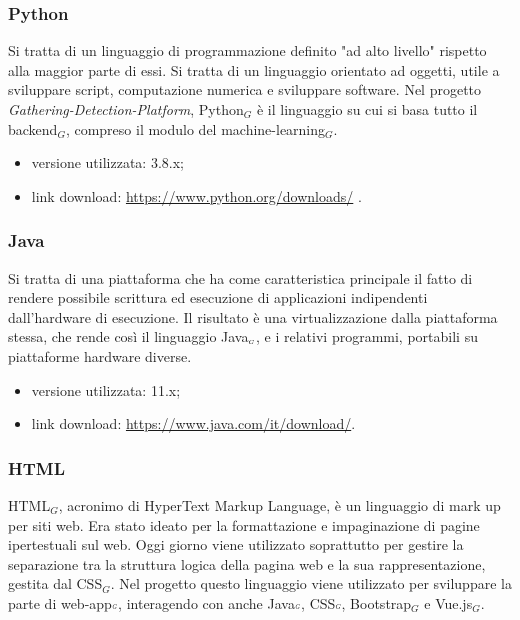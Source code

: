 \subsubsection{Python}\label{ProcessiPrimariCodificaPython}
Si tratta di un linguaggio di programmazione definito "ad alto livello" rispetto alla maggior parte di essi.
Si tratta di un linguaggio orientato ad oggetti, utile a sviluppare script, computazione numerica e sviluppare software.
Nel progetto \textit{Gathering-Detection-Platform}, Python$_G$ è il linguaggio su cui si basa tutto il backend$_G$, compreso il modulo del machine-learning$_G$.

\begin{itemize}
	\item versione utilizzata: 3.8.x;
	\item link download: \url{https://www.python.org/downloads/} .
\end{itemize}

\subsubsection{Java}\label{ProcessiPrimariCodificaJava}
Si tratta di una piattaforma che ha come caratteristica principale il fatto di rendere possibile scrittura ed esecuzione di applicazioni indipendenti dall'hardware di esecuzione.
Il risultato è una virtualizzazione dalla piattaforma stessa, che rende così il linguaggio Java$_{\scaleto{G}{3pt}}$, e i relativi programmi, portabili su piattaforme hardware diverse.

\begin{itemize}
	\item versione utilizzata: 11.x;
	\item link download: \url{https://www.java.com/it/download/}.
\end{itemize}

\subsubsection{HTML}\label{ProcessiPrimariCodificaHTML}
HTML$_G$, acronimo di HyperText Markup Language, è un linguaggio di mark up per siti web.
Era stato ideato per la formattazione e impaginazione di pagine ipertestuali sul web.
Oggi giorno viene utilizzato soprattutto per gestire la separazione tra la struttura logica della pagina web e la sua rappresentazione, gestita dal CSS$_G$.
Nel progetto questo linguaggio viene utilizzato per sviluppare la parte di web-app${\scaleto{G}{3pt}}$, interagendo con anche Java${\scaleto{G}{3pt}}$, CSS${\scaleto{G}{3pt}}$, Bootstrap$_G$ e Vue.js$_G$.

